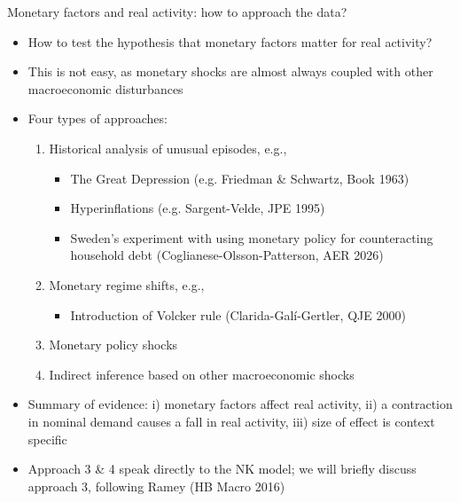 \documentclass[9pt,xcolor={dvipsnames}]{beamer}
\newcommand{\bit}{\begin{itemize}}
\newcommand{\eit}{\end{itemize}}
\newcommand{\ben}{\begin{enumerate}}
\newcommand{\een}{\end{enumerate}}
\begin{document}
\begin{frame}{Monetary factors and real activity: how to approach the data?}

\bit
\setlength\itemsep{1em} 

\item How to test the hypothesis that monetary factors matter for real activity?

\item This is not easy, as monetary shocks are almost always coupled with other macroeconomic disturbances

\item Four types of approaches:
\ben
\setlength\itemsep{0.5em} 
	\item Historical analysis of unusual episodes, e.g.,
		\bit
			\item The Great Depression (e.g. Friedman \& Schwartz, Book 1963)
			
			\item Hyperinflations (e.g. Sargent-Velde, JPE 1995)
			
			\item Sweden's experiment with using monetary policy for counteracting household debt (Coglianese-Olsson-Patterson, AER 2026)
		\eit
		
	
	\item Monetary regime shifts, e.g., 
		\bit
			\item Introduction of Volcker rule (Clarida-Gal\'{i}-Gertler, QJE 2000)
		\eit
	
	\item Monetary policy shocks
	
	\item Indirect inference based on other macroeconomic shocks
\een

\item Summary of evidence: i) monetary factors affect real activity, ii) a contraction in nominal demand causes a fall in real activity, iii) size of effect is context specific

\item Approach 3 \& 4 speak directly to the NK model; we will briefly discuss approach 3, following Ramey (HB Macro 2016)

\eit

\end{frame}
\end{document}
